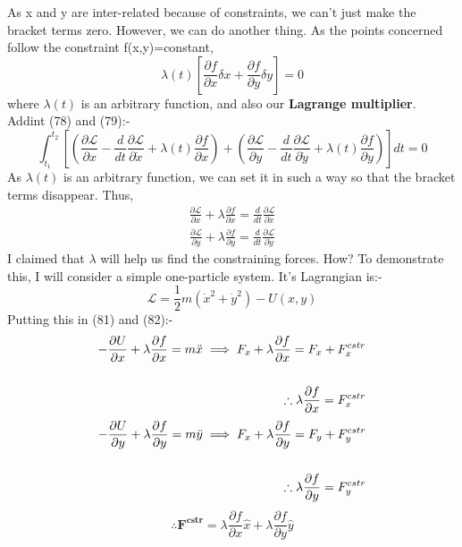 \documentclass[12pt]{article}
\begin{document}
    As x and y are inter-related because of constraints, we can't just make the bracket terms zero. However, we can do another thing.
    As the points concerned follow the constraint f(x,y)=constant,
    \begin{equation}
        \lambda(t)\left[\frac{\partial f}{\partial x}\delta x + \frac{\partial f}{\partial y}\delta y\right]=0
    \end{equation}
    where $\lambda(t)$ is an arbitrary function, and also our \textbf{Lagrange multiplier}.
    Addint (78) and (79):-
    \begin{equation}
        \int_{t_1}^{t_2}\left[\left(\frac{\partial \mathcal{L}}{\partial x}-\frac{d}{dt}\frac{\partial \mathcal{L}}{\partial \dot{x}}+\lambda(t)\frac{\partial f}{\partial x}\right) + \left(\frac{\partial \mathcal{L}}{\partial y}-\frac{d}{dt}\frac{\partial \mathcal{L}}{\partial \dot{y}}+\lambda(t)\frac{\partial f}{\partial y}\right)\right]dt=0
    \end{equation}
    As $\lambda(t)$ is an arbitrary function, we can set it in such a way so that the bracket terms disappear. Thus,
    \begin{align}
        \frac{\partial \mathcal{L}}{\partial x}+\lambda\frac{\partial f}{\partial x}=\frac{d}{dt}\frac{\partial \mathcal{L}}{\partial \dot{x}}
    \end{align}
    \begin{align}
        \frac{\partial \mathcal{L}}{\partial y}+\lambda\frac{\partial f}{\partial y}=\frac{d}{dt}\frac{\partial \mathcal{L}}{\partial \dot{y}}
    \end{align}
    I claimed that $\lambda$ will help us find the constraining forces. How? To demonstrate this, I will consider a simple one-particle system. It's Lagrangian is:-
    \begin{equation}
        \mathcal{L}=\frac{1}{2}m(\dot{x}^2+\dot{y}^2)-U(x,y)
    \end{equation}
    Putting this in (81) and (82):-
    \begin{align}
        -\frac{\partial U}{\partial x}+\lambda\frac{\partial f}{\partial x}=m\ddot{x}\implies F_x + \lambda\frac{\partial f}{\partial x} = F_x + F_x^{cstr}\notag \\ \notag \\ \therefore \lambda\frac{\partial f}{\partial x}=F_x^{cstr}
    \end{align}
    \begin{align}
        -\frac{\partial U}{\partial y}+\lambda\frac{\partial f}{\partial y}=m\ddot{y}\implies F_x + \lambda\frac{\partial f}{\partial y} = F_y + F_y^{cstr}\notag \\ \notag \\ \therefore \lambda\frac{\partial f}{\partial y}=F_y^{cstr}
    \end{align}
    \begin{equation}
        \therefore \mathbf{F^{cstr}}=\lambda\frac{\partial f}{\partial x}\hat{x}+\lambda\frac{\partial f}{\partial y}\hat{y}
    \end{equation}
\end{document}
